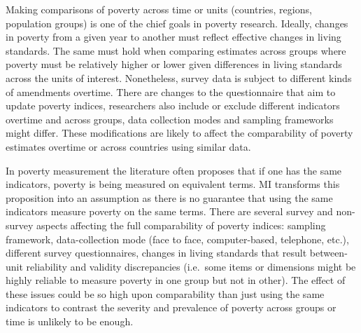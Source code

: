 \documentclass[]{book}
\begin{document}
Making comparisons of poverty across time or units (countries, regions, population groups) is one of the chief goals in poverty research. Ideally, changes in poverty from a given year to another must reflect effective changes in living standards. The same must hold when comparing estimates across groups where poverty must be relatively higher or lower given differences in living standards across the units of interest. Nonetheless, survey data is subject to different kinds of amendments overtime. There are changes to the questionnaire that aim to update poverty indices, researchers also include or exclude different indicators overtime and across groups, data collection modes and sampling frameworks might differ. These modifications are likely to affect the comparability of poverty estimates overtime or across countries using similar data.

In poverty measurement the literature often proposes that if one has the same indicators, poverty is being measured on equivalent terms. MI transforms this proposition into an assumption as there is no guarantee that using the same indicators measure poverty on the same terms. There are several survey and non-survey aspects affecting the full comparability of poverty indices: sampling framework, data-collection mode (face to face, computer-based, telephone, etc.), different survey questionnaires, changes in living standards that result between-unit reliability and validity discrepancies (i.e.~some items or dimensions might be highly reliable to measure poverty in one group but not in other). The effect of these issues could be so high upon comparability than just using the same indicators to contrast the severity and prevalence of poverty across groups or time is unlikely to be enough.
\end{document}
